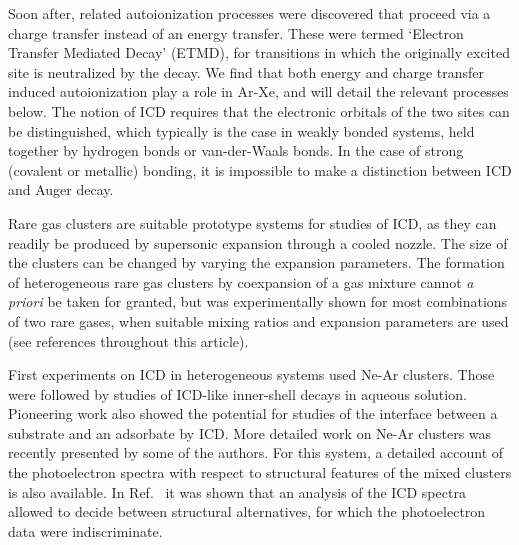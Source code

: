 Soon after, related 
autoionization processes were discovered that proceed via a 
charge transfer instead of an energy transfer. 
These were termed `Electron Transfer Mediated Decay' 
 (ETMD),\cite{zobeley,mueller,sakai,foerstel} for transitions in 
 which the originally excited site is neutralized by the decay.
We find that both energy and charge transfer induced 
autoionization play a role in Ar-Xe, and will detail the 
relevant processes below. The notion of ICD requires that the 
electronic orbitals of the two sites can be distinguished, which 
typically is the case in weakly bonded systems, held together by 
hydrogen bonds or van-der-Waals bonds. In the case of strong
(covalent or metallic) bonding, it is impossible to make a
distinction between ICD and Auger decay.\cite{hergenhahn_review}

Rare gas clusters are suitable prototype systems for studies of
ICD, as they can readily be produced by supersonic 
expansion through a cooled nozzle. 
The size of the clusters can be changed by varying the expansion parameters.
The formation of heterogeneous rare gas clusters by coexpansion of a gas mixture cannot {\it a priori} be taken for granted, but was experimentally shown for most combinations of two rare gases, when suitable mixing ratios and expansion parameters are used (see references throughout this article).

First experiments on ICD in heterogeneous systems used Ne-Ar 
clusters.\cite{barthnear} Those were followed by studies of 
ICD-like inner-shell decays in aqueous solution.\cite{aziz,pokapanich,pokapanich2011}
Pioneering work also showed the 
potential for studies of the interface between a substrate and an 
adsorbate by ICD.\cite{grieves} More detailed work on Ne-Ar 
clusters was recently presented by some of the authors.\cite{
fasshauer2014} For this system, a detailed account of the
photoelectron spectra with respect to structural features of the 
mixed clusters is also available.\cite{lundwall} In Ref.\  it was shown that an analysis of the ICD spectra 
allowed to decide between structural alternatives, for which the 
photoelectron data were indiscriminate.

